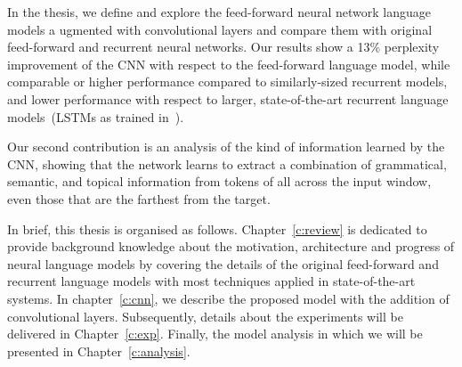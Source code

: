 In the thesis, we define and explore the feed-forward neural network language models a
ugmented with convolutional layers and compare them with original feed-forward and recurrent neural networks. Our
results show a 13\% perplexity improvement of the CNN with respect to
the feed-forward language model, while comparable or higher performance
compared to similarly-sized recurrent models, and lower performance
with respect to larger, state-of-the-art recurrent language
models~(LSTMs as trained in~).

Our second contribution is an analysis of the kind of information
learned by the CNN, showing that the network learns to extract a
combination of grammatical, semantic, and topical information from
tokens of all across the input window, even those that are the
farthest from the target.

In brief, this thesis is organised as follows. Chapter~\ref{c:review} is 
dedicated to provide background knowledge about the motivation, architecture and
progress of neural language models by covering the details of the original
feed-forward and recurrent language models with most techniques applied in 
state-of-the-art systems. In chapter~\ref{c:cnn}, we describe the proposed
model with the addition of convolutional layers. Subsequently, details about the 
experiments will be delivered in Chapter~\ref{c:exp}. Finally, the model analysis in which we  will be presented in Chapter~\ref{c:analysis}.




